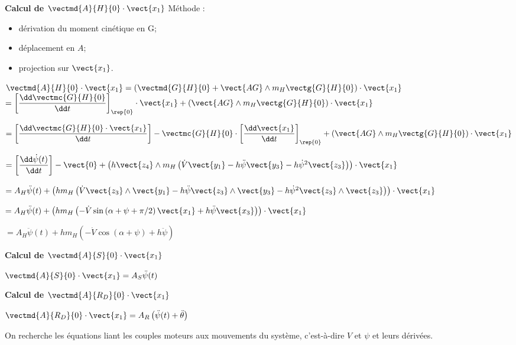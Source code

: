 \ifprof
\begin{corrige}

\textbf{Calcul de $\vectmd{A}{H}{0}\cdot \vect{x_1}$}
Méthode : 
\begin{itemize}
\item dérivation du moment cinétique en G;
\item déplacement en $A$;
\item projection sur $\vect{x_1}$.
\end{itemize}

$\vectmd{A}{H}{0}\cdot \vect{x_1} = \left(\vectmd{G}{H}{0} + \vect{AG}\wedge m_H  \vectg{G}{H}{0} \right)\cdot \vect{x_1}$
$ = \left[\dfrac{\dd \vectmc{G}{H}{0}}{\dd t}\right]_{\rep{0}} \cdot \vect{x_1}+ \left(\vect{AG}\wedge m_H  \vectg{G}{H}{0}\right) \cdot \vect{x_1} $


$ = \left[\dfrac{\dd \vectmc{G}{H}{0}\cdot \vect{x_1}}{\dd t}\right]
- \vectmc{G}{H}{0}\cdot \left[\dfrac{\dd \vect{x_1}}{\dd t}\right]_{\rep{0}}
+ \left(\vect{AG}\wedge m_H  \vectg{G}{H}{0}\right) \cdot \vect{x_1} $

$ = \left[\dfrac{\dd \dot{\psi}(t)}{\dd t}\right]
- \vect{0}
+ \left(h\vect{z_4}\wedge m_H  \left(  \dot{V}\vect{y_1} - h\ddot{\psi} \vect{y_3}- h\dot{\psi}^2 \vect{z_3}\right)\right) \cdot \vect{x_1} $

$ = A_H\ddot{\psi}(t)
+ \left(h m_H  \left(  \dot{V}\vect{z_3}\wedge \vect{y_1} - h\ddot{\psi} \vect{z_3}\wedge\vect{y_3}- h\dot{\psi}^2 \vect{z_3}\wedge \vect{z_3}\right)\right) \cdot \vect{x_1} $

$ =  A_H\ddot{\psi}(t)
+ \left(h m_H  \left(  - \dot{V}\sin\left( \alpha + \psi + \pi/2 \right)  \vect{x_1} + h\ddot{\psi} \vect{x_3} \right)\right) \cdot \vect{x_1} $

$ = A_H\ddot{\psi}(t) + h m_H  \left(  - \dot{V}\cos\left( \alpha + \psi  \right)  + h\ddot{\psi}  \right) $


\textbf{Calcul de $\vectmd{A}{S}{0}\cdot \vect{x_1}$}

$\vectmd{A}{S}{0}\cdot \vect{x_1} = A_S \ddot{\psi}(t) $

\textbf{Calcul de $\vectmd{A}{R_D}{0}\cdot \vect{x_1}$}

$\vectmd{A}{R_D}{0}\cdot \vect{x_1}  =  A_R \left( \ddot{\psi}(t) + \ddot{\theta}\right) $


\end{corrige}
\else
\fi

On recherche les équations liant les couples moteurs aux mouvements du système, c’est-à-dire $V$ et $\psi$ et leurs dérivées.


